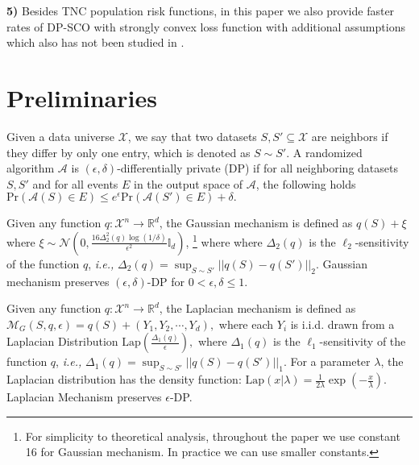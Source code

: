 \documentclass[12pt]{alt2022} %
\begin{document}
\textbf{5)} Besides TNC population risk functions, in this paper we also provide faster rates of DP-SCO with strongly convex loss function with additional assumptions which also has not been studied in \citep{asi2021adapting}. 
	\section{Preliminaries}
	\begin{definition}\label{def:3.1}
	Given a data universe $\mathcal{X}$, we say that two datasets $S,S'\subseteq \mathcal{X}$ are neighbors if they differ by only one entry, which is denoted as $S \sim S'$. A randomized algorithm $\mathcal{A}$ is $(\epsilon,\delta)$-differentially private (DP) if for all neighboring datasets $S,S'$ and for all events $E$ in the output space of $\mathcal{A}$, the following holds
	$\text{Pr}(\mathcal{A}(S)\in E)\leq e^{\epsilon} \text{Pr}(\mathcal{A}(S')\in E)+\delta.$
\end{definition}
	\begin{definition}
	Given any function $q : \mathcal{X}^n\rightarrow \mathbb{R}^d$, the Gaussian mechanism is defined as  $q(S)+\xi$ where $\xi\sim \mathcal{N}(0,\frac{16\Delta^2_2(q)\log(1/\delta)}{\epsilon^2}\mathbb{I}_d)$, \footnote{For simplicity to theoretical analysis, throughout the paper we use constant 16 for Gaussian mechanism. In practice we can use smaller constants.} where where $\Delta_2(q)$ is the $\ell_2$-sensitivity of the function $q$,
{\em i.e.,}
		$\Delta_2(q)=\sup_{S\sim S'}||q(S)-q(S')||_2.$	Gaussian mechanism preserves $(\epsilon, \delta)$-DP for $0<\epsilon, \delta\leq 1$.
	\end{definition}
\begin{definition}\label{def:3.3}
	{ Given any function $q : \mathcal{X}^n\rightarrow \mathbb{R}^d$, the Laplacian mechanism is defined as $\mathcal{M}_G(S,q,\epsilon)=q(S)+ (Y_1, Y_2, \cdots, Y_d),$
	where each $Y_i$ is i.i.d. drawn from a Laplacian Distribution $\text{Lap}(\frac{\Delta_1(q)}{\epsilon}),$ where $\Delta_1(q)$ is the $\ell_1$-sensitivity of the function $q$, {\em i.e.,}
		$\Delta_1(q)=\sup_{S\sim S'}||q(S)-q(S')||_1.$ For a parameter $\lambda$, the Laplacian distribution has the density function: 
$\text{Lap}(x|\lambda)=\frac{1}{2\lambda}\exp(-\frac{x}{\lambda}).$
		Laplacian Mechanism preserves $\epsilon$-DP.}
\end{definition}
\end{document}
